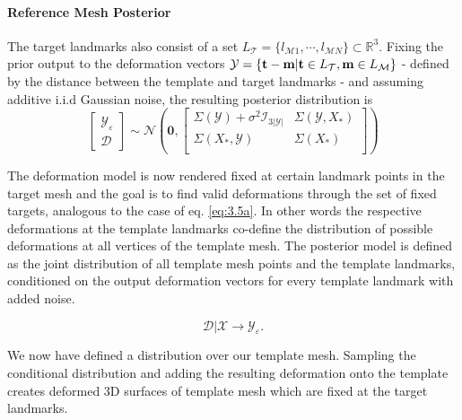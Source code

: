 \paragraph{Reference Mesh Posterior}
The target landmarks also consist of a set $L_{\mathcal{T}} = \{l_{\mathcal{M}1},\cdots, l_{\mathcal{M}N}\} \subset \mathbb{R}^3$. 
Fixing the prior output to the deformation vectors $\mathcal{Y}=\{\textbf{t}-\textbf{m}\vert \textbf{t} \in L_{\mathcal{T}}, \textbf{m} \in L_{\mathcal{M}}\}$ - defined by the distance between the template and target landmarks - and assuming additive i.i.d Gaussian noise, the resulting posterior distribution is
\begin{equation}
    \begin{bmatrix}\mathcal{Y_{\varepsilon}}\\\mathcal{D}\end{bmatrix}
\sim \mathcal{N}\left(\textbf{0},
\begin{bmatrix}
    \Sigma(\mathcal{Y}) + \sigma^2\mathcal{I}_{3\left|\mathcal{Y} \right|} & \Sigma(\mathcal{Y},X_{*})\\
    \Sigma(X_{*},\mathcal{Y}) & \Sigma(X_{*})\\
\end{bmatrix}
\right)
\end{equation}

The deformation model is now rendered fixed at certain landmark points in the target mesh and the goal is to find valid deformations through the set of fixed targets, analogous to the case of eq. \ref{eq:3.5a}. In other words the respective deformations at the template landmarks co-define the distribution of possible deformations at all vertices of the template mesh. The posterior model is defined as the joint distribution of all template mesh points and the template landmarks, conditioned on the output deformation vectors for every template landmark with added noise.
\begin{center}
\begin{equation}
    \mathcal{D}\vert \mathcal{X} \rightarrow \mathcal{Y}_{\varepsilon}. 
\end{equation}
\end{center}
We now have defined a distribution over our template mesh. Sampling the conditional distribution and adding the resulting deformation onto the template creates deformed 3D surfaces of template mesh which are fixed at the target landmarks.

